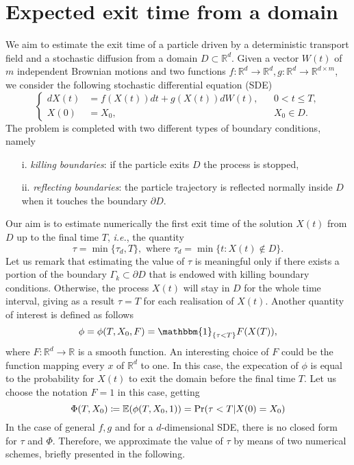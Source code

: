 \section{Expected exit time from a domain}
We aim to estimate the exit time of a particle driven by a deterministic transport field and a stochastic diffusion from a domain $D \subset \mathbb{R}^d$. Given a vector $W(t)$ of $m$ independent Brownian motions and two functions $f\colon \mathbb{R}^d \rightarrow \mathbb{R}^d, g \colon \mathbb{R}^d \rightarrow \mathbb{R}^{d\times m}$, we consider the following stochastic differential equation (SDE)
\begin{equation}\label{eq:GeneralModel}
\left \{
\begin{aligned}
	dX(t) &= f(X(t)) dt + g(X(t))dW(t), && 0 < t \leq T, \\
	X(0)  &= X_0, && X_0 \in D.
\end{aligned} \right .
\end{equation}
The problem is completed with two different types of boundary conditions, namely
\begin{itemize}
	\item[i.]  \textit{killing boundaries}: if the particle exits $D$ the process is stopped,
	\item[ii.] \textit{reflecting boundaries}: the particle trajectory is reflected normally inside $D$ when it touches the boundary $\partial D$.
\end{itemize}
Our aim is to estimate numerically the first exit time of the solution $X(t)$ from $D$ up to the final time $T$, \textit{i.e.}, the quantity
\begin{equation}\label{eq:GeneralTau}
	\tau = \min\{\tau_d,T\}, \text{ where } \tau_d = \min\{t\colon X(t)\notin D\}.
\end{equation}
Let us remark that estimating the value of $\tau$ is meaningful only if there exists a portion of the boundary $\Gamma_k \subset \partial D$ that is endowed with killing boundary conditions. Otherwise, the process $X(t)$ will stay in $D$ for the whole time interval, giving as a result $\tau = T$ for each realisation of $X(t)$. Another quantity of interest is defined as follows
\begin{equation}\label{eq:GeneralPhi}
	\phi = \phi(T,X_0,F) = \mathbbm{1}_{\{\tau < T\}}F(X(T)),
\end{equation}
where $F\colon \mathbb{R}^d \rightarrow \mathbb{R}$ is a smooth function. An interesting choice of $F$ could be the function mapping every $x$ of $\mathbb{R}^d$ to one. In this case, the expecation of $\phi$ is equal to the probability for $X(t)$ to exit the domain before the final time $T$. Let us choose the notation $F = 1$ in this case, getting
\begin{equation}\label{eq:ExitProb}
	\Phi(T,X_0) \coloneqq \mathbb{E}(\phi(T,X_0,1)) = \Pr(\tau < T | X(0) = X_0)
\end{equation}
In the case of general $f,g$ and for a $d$-dimensional SDE, there is no closed form for $\tau$ and $\Phi$. Therefore, we approximate the value of $\tau$ by means of two numerical schemes, briefly presented in the following.





